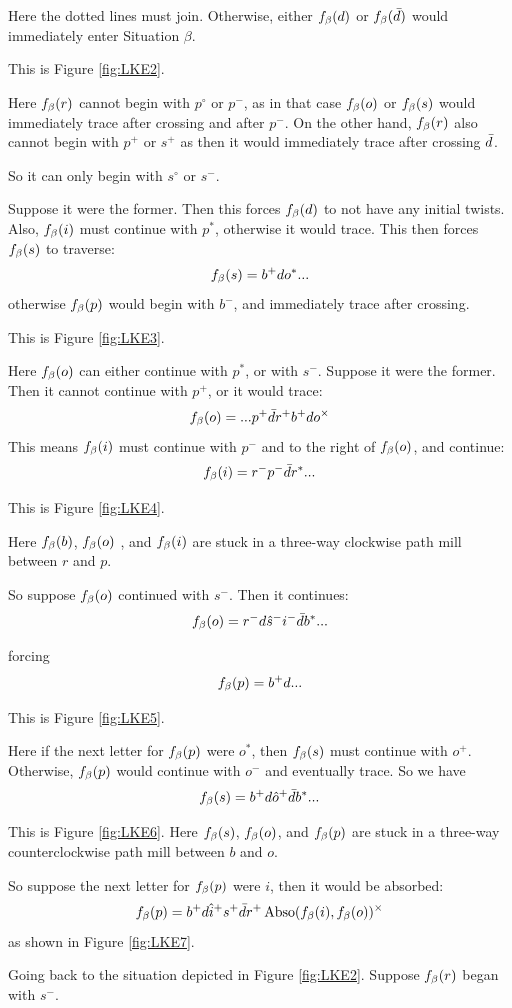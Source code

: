 Here the dotted lines must join. Otherwise, either $f_\beta(d)$ or $f_\beta(\bar{d})$ would immediately enter Situation $\beta$.

This is Figure \ref{fig:LKE2}.

Here $f_\beta(r)$ cannot begin with $p^\circ$ or $p^-$, as in that case $f_\beta(o)$ or $f_\beta(s)$ would immediately trace after crossing and after $p^-$. On the other hand, $f_\beta(r)$ also cannot begin with $p^+$ or $s^+$ as then it would immediately trace after crossing $\bar{d}$.

So it can only begin with $s^\circ$ or $s^-$. 

Suppose it were the former. Then this forces $f_\beta(d)$ to not have any initial twists. Also, $f_\beta(i)$ must continue with $p^*$, otherwise it would trace. This then forces $f_\beta(s)$ to traverse:
\[
f_\beta(s) = b^+ d o^*...
\]
otherwise $f_\beta(p)$ would begin with $b^-$, and immediately trace after crossing.

This is Figure \ref{fig:LKE3}.

Here $f_\beta(o)$ can either continue with $p^*$, or with $s^-$. Suppose it were the former. Then it cannot continue with $p^+$, or it would trace:
\[
f_\beta(o) =...p^+ \bar{d} r^+ b^+ d o^\times
\]
This means $f_\beta(i)$ must continue with $p^-$ and to the right of $f_\beta(o)$, and continue:
\[
f_\beta(i) = r^- p^- \bar{d} r^*...
\]

This is Figure \ref{fig:LKE4}.

Here $f_\beta(b)$, $f_\beta(o)$ , and $f_\beta(i)$ are stuck in a three-way clockwise path mill between $r$ and $p$.

So suppose $f_\beta(o)$ continued with $s^-$. Then it continues:
\[
f_\beta(o) = r^- d \hat{s}^- i^- \bar{d} b^*...
\]

forcing
\[
f_\beta(p) = b^+ d...
\]

This is Figure \ref{fig:LKE5}.

Here if the next letter for $f_\beta(p)$ were $o^*$, then $f_\beta(s)$ must continue with $o^+$. Otherwise, $f_\beta(p)$ would continue with $o^-$ and eventually trace. So we have
\[
f_\beta(s) = b^+ d \hat{o}^+ \bar{d} b^*...
\]

This is Figure \ref{fig:LKE6}. Here $f_\beta(s)$, $f_\beta(o)$, and $f_\beta(p)$ are stuck in a three-way counterclockwise path mill between $b$ and $o$.

So suppose the next letter for $f_\beta(p)$ were $i$, then it would be absorbed:
\[ 
f_\beta(p) = b^+ d \hat{i}^+ s^+ \bar{d} r^+ \operatorname{Abso}(f_\beta(i), f_\beta(o))^\times
\]
as shown in Figure \ref{fig:LKE7}.

Going back to the situation depicted in Figure \ref{fig:LKE2}. Suppose $f_\beta(r)$ began with $s^-$. 

